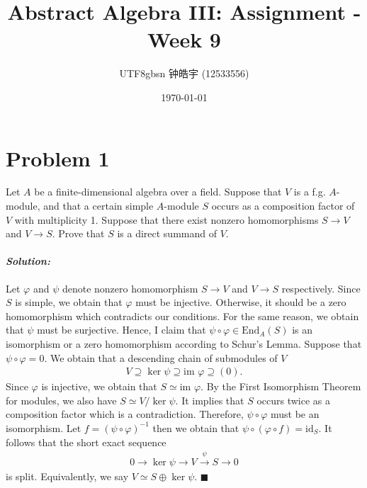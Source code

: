 \documentclass[12pt, a4paper]{article}
\title{Abstract Algebra III: Assignment - Week 9}
\author{
    \begin{CJK*}{UTF8}{gbsn}
    钟皓宇 (12533556)
    \end{CJK*}
}
\date{\today}
\theoremstyle{remark}
\newenvironment{solution}
  {\paragraph{\textit{Solution:}}\par\medskip}
  {\hfill$\blacksquare$\vspace{0.1cm}}
\begin{document}
\maketitle

\section*{Problem 1}
Let $A$ be a finite-dimensional algebra over a field. Suppose that $V$ is a f.g. $A$-module, and that a certain simple $A$-module $S$ occurs as a composition factor of $V$ with multiplicity 1. Suppose that there exist nonzero homomorphisms $S \to V$ and $V \to S$. Prove that $S$ is a direct summand of $V$.
\begin{solution}
    Let $\varphi$ and $\psi$ denote nonzero homomorphism $S\to V$ and $V\to S$ respectively.
    Since $S$ is simple, we obtain that $\varphi$ must be injective. Otherwise, it should be a zero homomorphism which contradicts our conditions.
    For the same reason, we obtain that $\psi$ must be surjective. Hence, I claim that $\psi\circ \varphi\in \text{End}_A(S)$ is an isomorphism or a zero homomorphism according to Schur's Lemma.
    Suppose that $\psi\circ \varphi=0$. We obtain that a descending chain of submodules of $V$
    \begin{align*}
        V\supseteq \ker{\psi}\supseteq \text{im }\varphi\supseteq (0).
    \end{align*}
    Since $\varphi$ is injective, we obtain that $S\simeq \text{im }\varphi$. By the First Isomorphism Theorem for modules, we also have $S\simeq V/{\ker \psi}$.
    It implies that $S$ occurs twice as a composition factor which is a contradiction. Therefore, $\psi\circ \varphi$ must be an isomorphism.
    Let $f= (\psi\circ\varphi)^{-1}$ then we obtain that $\psi\circ(\varphi\circ f)=\text{id}_S$. It follows that the short exact sequence 
    \begin{align*}
        0\to \ker \psi \to V \xrightarrow{\psi} S\to 0
    \end{align*}
    is split. Equivalently, we say $V\simeq S\oplus \ker \psi$.
\end{solution}
\end{document}
